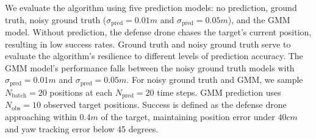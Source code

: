 
We evaluate the algorithm using five prediction models: no prediction, ground truth, noisy ground truth ($\sigma_\text{pred} = 0.01 \si{m}$ and $\sigma_\text{pred} = 0.05 \si{m}$), and the GMM model. 
Without prediction, the defense drone chases the target's current position, resulting in low success rates. 
Ground truth and noisy ground truth serve to evaluate the algorithm's resilience to different levels of prediction accuracy.
The GMM model's performance falls between the noisy ground truth models with $\sigma_\text{pred} = 0.01 \si{m}$ and $\sigma_\text{pred} = 0.05 \si{m}$. 
For noisy ground truth and GMM, we sample $N_\text{batch} = 20$ positions at each $N_\text{pred} = 20$ time steps. 
GMM prediction uses $N_\text{obs} = 10$ observed target positions. 
Success is defined as the defense drone approaching within $0.4 \si{m}$ of the target, maintaining position error under $40 \si{cm}$ and yaw tracking error below 45 degrees.

